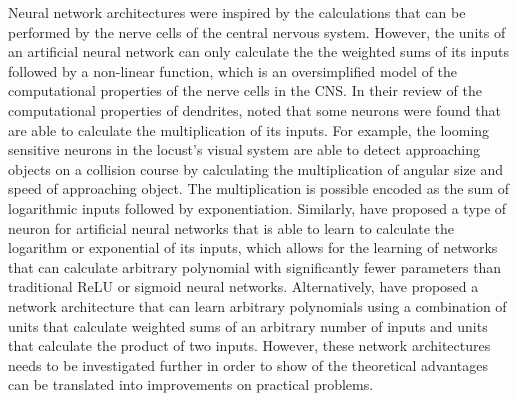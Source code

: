 Neural network architectures were inspired by the calculations that can be
performed by the nerve cells of the central nervous system. However, the units
of an artificial neural network can only calculate the the weighted sums of its
inputs followed by a non-linear function, which is an oversimplified model of
the computational properties of the nerve cells in the CNS. In their review of
the computational properties of dendrites, \citet{london2005} noted that some
neurons were found that are able to calculate the multiplication of its inputs.
For example, the looming sensitive neurons in the locust's visual system are
able to detect approaching objects on a collision course by calculating the
multiplication of angular size and speed of approaching object. The
multiplication is possible encoded as the sum of logarithmic inputs followed by
exponentiation. Similarly, \citet{logarithmic} have proposed a type of neuron
for artificial neural networks that is able to learn to calculate the logarithm
or exponential of its inputs, which allows for the learning of networks that can
calculate arbitrary polynomial with significantly fewer parameters than
traditional ReLU or sigmoid neural networks. Alternatively, \citet{dpn} have
proposed a network architecture that can learn arbitrary polynomials using a
combination of units that calculate weighted sums of an arbitrary number of
inputs and units that calculate the product of two inputs. However, these
network architectures needs to be investigated further in order to show of the
theoretical advantages can be translated into improvements on practical
problems.


